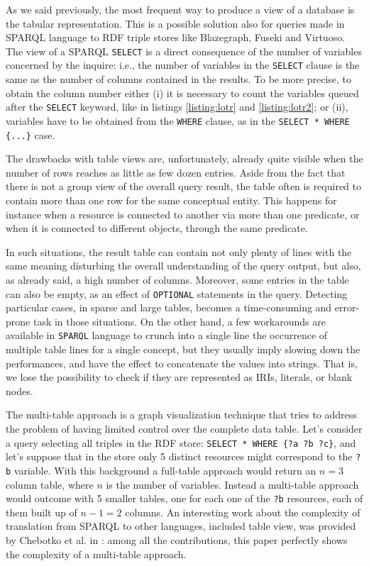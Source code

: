 As we said previously, the most frequent way to produce a view of a database is the tabular representation. This is a possible solution also for queries made in SPARQL language to RDF triple stores like Blazegraph, Fuseki and Virtuoso. The view of a SPARQL \texttt{SELECT} is a direct consequence of the number of variables concerned by the inquire: i.e., the number of variables in the \texttt{SELECT} clause is the same as the number of columns contained in the results. To be more precise, to obtain the column number either (i) it is necessary to count the variables queued after the \texttt{SELECT} keyword, like in listings \ref{listing:lotr} and \ref{listing:lotr2}; or (ii), variables have to be obtained from the \texttt{WHERE} clause, as in the \texttt{SELECT * WHERE \{...\}} case.

The drawbacks with table views are, unfortunately, already quite visible when the number of rows reaches as little as few dozen entries. Aside from the fact that there is not a group view of the overall query result, the table often is required to contain more than one row for the same conceptual entity. This happens for instance when a resource is connected to another via more than one predicate, or when it is connected to different objects, through the same predicate.

In such situations, the result table can contain not only plenty of lines with the same meaning disturbing the overall understanding of the query output, but also, as already said, a high number of columns. Moreover, some entries in the table can also be empty, as an effect of \texttt{OPTIONAL} statements in the query. Detecting particular cases, in sparse and large tables, becomes a time-consuming and error-prone task in those situations. On the other hand, a few workarounds are available in \texttt{SPARQL} language to crunch into a single line the occurrence of multiple table lines for a single concept, but they usually imply slowing down the performances, and have the effect to concatenate the values into strings. That is, we lose the possibility to check if they are represented as IRIs, literals, or blank nodes.

The multi-table approach is a graph visualization technique that tries to address the problem of having limited control over the complete data table. Let's consider a query selecting all triples in the RDF store: \texttt{SELECT * WHERE \{?a ?b ?c\}}, and let's suppose that in the store only 5 distinct resources might correspond to the \texttt{?b} variable. With this background a full-table approach would return an $n=3$ column table, where $n$ is the number of variables. Instead a multi-table approach would outcome with 5 smaller tables, one for each one of the \texttt{?b} resources, each of them built up of $n-1=2$ columns. An interesting work about the complexity of translation from SPARQL to other languages, included table view, was provided by Chebotko et al. in \cite{chebotko2007storing}: among all the contributions, this paper perfectly shows the complexity of a multi-table approach.

